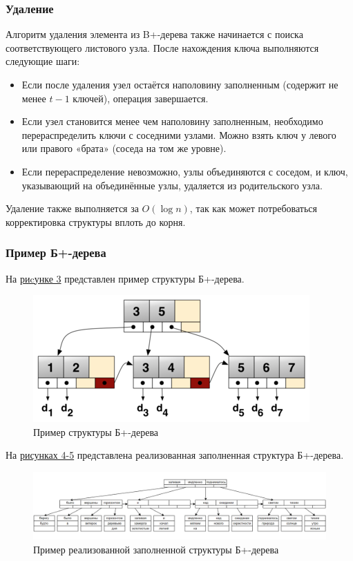 \documentclass[11pt,a4paper,final]{article} %
\begin{document}
\subsubsection{Удаление}
Алгоритм удаления элемента из B+-дерева также начинается с поиска соответствующего листового узла. После нахождения ключа выполняются следующие шаги:
\begin{itemize}
	\item Если после удаления узел остаётся наполовину заполненным (содержит не менее $t - 1$ ключей), операция завершается.
	\item Если узел становится менее чем наполовину заполненным, необходимо перераспределить ключи с соседними узлами. Можно взять ключ у левого или правого «брата» (соседа на том же уровне).
	\item Если перераспределение невозможно, узлы объединяются с соседом, и ключ, указывающий на объединённые узлы, удаляется из родительского узла.
\end{itemize}
Удаление также выполняется за $O(\log n)$, так как может потребоваться корректировка структуры вплоть до корня.

\subsubsection{Пример Б+-дерева}
На \hyperref[fig:pic2]{риcунке 3} представлен пример структуры Б+-дерева. 

\begin{figure}[H]
	\centering
	\includegraphics[width=0.7\linewidth]{img/pic2.png}
	\caption{Пример структуры Б+-дерева}
	\label{fig:pic2}
\end{figure}

На \hyperref[fig:tree]{рисунках 4-5} представлена реализованная заполненная структура Б+-дерева.

\begin{figure}[H]
	\centering
	\includegraphics[width=1.05\linewidth]{img/tree.png}
	\caption{Пример реализованной заполненной структуры Б+-дерева}
	\label{fig:tree}
\end{figure}
\end{document}
